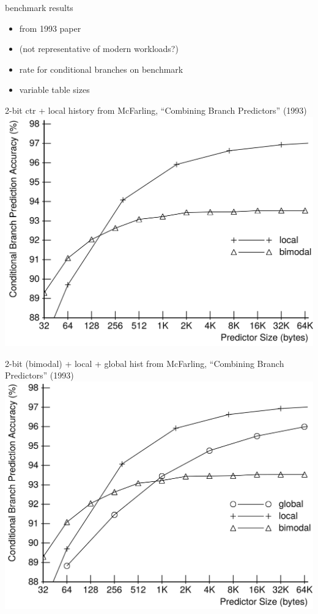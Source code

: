 
\begin{frame}{benchmark results}
\begin{itemize}
\item from 1993 paper
\item (not representative of modern workloads?)
\item rate for conditional branches on benchmark
\item variable table sizes
\end{itemize}
\end{frame}

\begin{frame}{2-bit ctr + local history}
from McFarling, ``Combining Branch Predictors'' (1993)
\includegraphics[height=0.8\textheight]{../bpred/mcf-local-bimodal}
\end{frame}

\begin{frame}{2-bit (bimodal) + local + global hist}
from McFarling, ``Combining Branch Predictors'' (1993)
\includegraphics[height=0.8\textheight]{../bpred/mcf-local-bimodal-global}
\end{frame}

